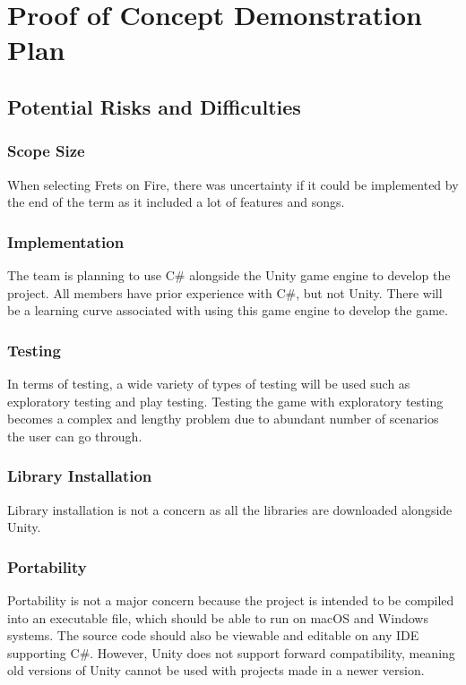 \documentclass[12pt,letterpaper]{article}
\begin{document}
\section{Proof of Concept Demonstration Plan}
\subsection{Potential Risks and Difficulties}

\subsubsection{Scope Size}
When selecting Frets on Fire, there was uncertainty if it could be implemented by the end of the term as it included a lot of features and songs.

\subsubsection{Implementation}
The team is planning to use C\# alongside the Unity game engine to develop the project. All members have prior experience with C\#, but not Unity. There will be a learning curve associated with using this game engine to develop the game.

\subsubsection{Testing}
In terms of testing, a wide variety of types of testing will be used such as exploratory testing and play testing. Testing the game with exploratory testing becomes a complex and lengthy problem due to abundant number of scenarios the user can go through. 

\subsubsection{Library Installation}
Library installation is not a concern as all the libraries are downloaded alongside Unity.

\subsubsection{Portability}
Portability is not a major concern because the project is intended to be compiled into an executable file, which should be able to run on macOS and Windows systems. The source code should also be viewable and editable on any IDE supporting C\#. However, Unity does not support forward compatibility, meaning old versions of Unity cannot be used with projects made in a newer version.
\end{document}
